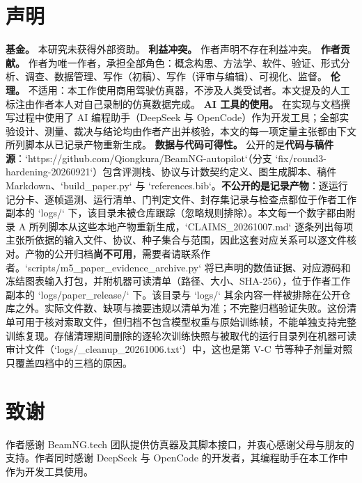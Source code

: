\documentclass[journal]{IEEEtran}
\begin{document}
\section*{声明}
\textbf{基金。} 本研究未获得外部资助。
\textbf{利益冲突。} 作者声明不存在利益冲突。
\textbf{作者贡献。} 作者为唯一作者，承担全部角色：概念构思、方法学、软件、验证、形式分析、调查、数据管理、写作（初稿）、写作（评审与编辑）、可视化、监督。
\textbf{伦理。} 不适用：本工作使用商用驾驶仿真器，不涉及人类受试者。本文提及的人工标注由作者本人对自己录制的仿真数据完成。
\textbf{AI 工具的使用。} 在实现与文档撰写过程中使用了 AI 编程助手（DeepSeek 与 OpenCode）作为开发工具；全部实验设计、测量、裁决与结论均由作者产出并核验，本文的每一项定量主张都由下文所列脚本从已记录产物重新生成。
\textbf{数据与代码可得性。} 公开的是\textbf{代码与稿件源}：`https://github.com/Qiongkura/BeamNG-autopilot`（分支 `fix/round3-hardening-20260921`）包含评测栈、协议与计数契约定义、图生成脚本、稿件 Markdown、`build_paper.py` 与 `references.bib`。\textbf{不公开的是记录产物}：逐运行记分卡、逐帧遥测、运行清单、门判定文件、封存集记录与检查点都位于作者工作副本的 `logs/` 下，该目录未被仓库跟踪（忽略规则排除）。本文每一个数字都由附录 A 所列脚本从这些本地产物重新生成，`CLAIMS_20261007.md` 逐条列出每项主张所依据的输入文件、协议、种子集合与范围，因此这套对应关系可以逐文件核对。产物的公开归档\textbf{尚不可用}，需要者请联系作者。`scripts/m5_paper_evidence_archive.py` 将已声明的数值证据、对应源码和冻结图表输入打包，并附机器可读清单（路径、大小、SHA-256），位于作者工作副本的 `logs/paper_release/` 下。该目录与 `logs/` 其余内容一样被排除在公开仓库之外。实际文件数、缺项与摘要违规以清单为准；不完整归档验证失败。这份清单可用于核对索取文件，但归档不包含模型权重与原始训练帧，不能单独支持完整训练复现。存储清理期间删除的逐轮次训练快照与被取代的运行目录列在机器可读审计文件（`logs/_cleanup_20261006.txt`）中，这也是第 V-C 节等种子剂量对照只覆盖四档中的三档的原因。
\section*{致谢}
作者感谢 BeamNG.tech 团队提供仿真器及其脚本接口，并衷心感谢父母与朋友的支持。作者同时感谢 DeepSeek 与 OpenCode 的开发者，其编程助手在本工作中作为开发工具使用。
\end{document}

